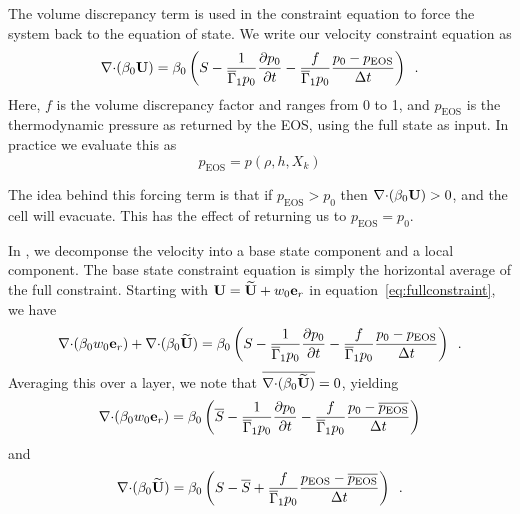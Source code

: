 The volume discrepancy term is used in the constraint equation to
force the system back to the equation of state.  We write our velocity
constraint equation as
\begin{equation}
\mathbf{\nabla} \mathbf{\cdot} (\beta_0 {\bf U})  = \beta_0 \left(S - \frac{1}{\overline{\Gamma}_1 p_0} \frac{\partial p_0}{\partial t} - \frac{f}{\overline{\Gamma}_1 p_0} \frac{p_0 - p_\mathrm{EOS}}{\Delta t} \right ) \enskip .
\label{eq:fullconstraint}
\end{equation}
Here, $f$ is the volume discrepancy factor and ranges from 0 to 1, and
$p_\mathrm{EOS}$ is the thermodynamic pressure as returned by the EOS,
using the full state as input.
In practice we evaluate this as
\begin{equation}
p_\mathrm{EOS} = p(\rho,h,X_k)
\end{equation}

The idea behind this forcing term is that if $p_\mathrm{EOS} > p_0$ then
$\mathbf{\nabla} \mathbf{\cdot} (\beta_0 {\bf U}) > 0$, and the cell will evacuate.  This
has the effect of returning us to $p_\mathrm{EOS} = p_0$.

In \maestro, we decomponse the velocity into a base state component
and a local component.  The base state constraint equation is simply
the horizontal average of the full constraint.  Starting with 
${\bf U} = \widetilde{{\bf U}} + w_0 \mathbf{e}_r$ in equation~\ref{eq:fullconstraint}, we have
\begin{equation}
\mathbf{\nabla} \mathbf{\cdot} (\beta_0 w_0 \mathbf{e}_r) + \mathbf{\nabla} \mathbf{\cdot} (\beta_0 \widetilde{{\bf U}})  = \beta_0 \left(S - \frac{1}{\overline{\Gamma}_1 p_0} \frac{\partial p_0}{\partial t} - \frac{f}{\overline{\Gamma}_1 p_0} \frac{p_0 - p_\mathrm{EOS}}{\Delta t} \right ) \enskip .
\label{eq:fullconstraint2}
\end{equation}
Averaging this over a layer, we note that $\overline{\mathbf{\nabla} \mathbf{\cdot} (\beta_0 \widetilde{{\bf U}})} = 0$,
yielding
\begin{equation}
\mathbf{\nabla} \mathbf{\cdot} (\beta_0 w_0 \mathbf{e}_r)  = \beta_0 \left(\overline{S} - \frac{1}{\overline{\Gamma}_1 p_0} \frac{\partial p_0}{\partial t} - \frac{f}{\overline{\Gamma}_1 p_0} \frac{p_0 - \overline{p_\mathrm{EOS}}}{\Delta t} \right ) 
\label{eq:w0constraint_vd}
\end{equation}
and
\begin{equation}
\mathbf{\nabla} \mathbf{\cdot} (\beta_0 \widetilde{{\bf U}})  = \beta_0 \left(S - \overline{S} + \frac{f}{\overline{\Gamma}_1 p_0} \frac{p_\mathrm{EOS} - \overline{p_\mathrm{EOS}}}{\Delta t} \right ) \enskip .
\label{eq:Utconstraint_vd}
\end{equation}

